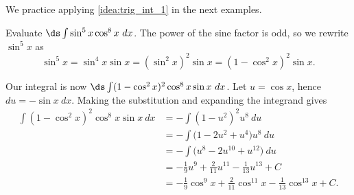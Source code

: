 We practice applying \autoref{idea:trig_int_1} in the next examples.

\begin{example}\label{ex_trigint1}
Evaluate $\ds\int\sin^5x\cos^8x\ dx$.
\solution
The power of the sine factor is odd, so we rewrite $\sin^5x$ as
\[\sin^5x = \sin^4x\sin x = (\sin^2x)^2\sin x = (1-\cos^2x)^2\sin x.\]

Our integral is now $\ds \int (1-\cos^2x)^2\cos^8x\sin x\ dx$. Let $u = \cos x$, hence $du = -\sin x\ dx$. Making the substitution and expanding the integrand gives
\begin{align*}
 \int (1-\cos^2x)^2\cos^8x\sin x\ dx
 &= -\int (1-u^2)^2u^8\ du \\
 &= -\int \big(1-2u^2+u^4\big)u^8\ du \\
 &= -\int \big(u^8-2u^{10}+u^{12}\big)\ du \\
 &= -\frac19u^9 + \frac2{11}u^{11} - \frac1{13}u^{13} + C \\
 &=-\frac19\cos^9 x + \frac2{11}\cos^{11} x - \frac1{13}\cos^{13} x + C.
\end{align*}
\end{example}

